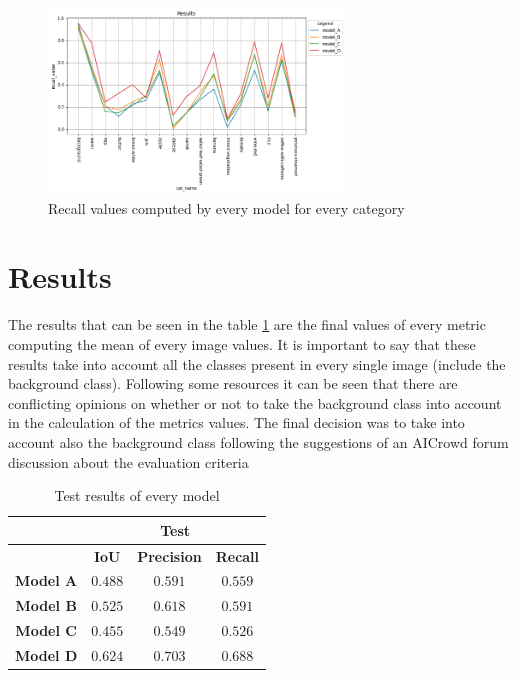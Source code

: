 \documentclass[a4paper,10pt]{report}
\begin{document}
\begin{figure}[h]
    \centering
    \includegraphics[width=0.7\textwidth]{assets/img/cat_recall.png}
    \caption{Recall values computed by every model for every category}
    \label{fig:cat_recall}
\end{figure}


\clearpage\section{Results}\label{sec:section-52}

The results that can be seen in the table \ref{table:test_results} are the final values of every metric computing the mean of every image values. It is important to say that these results take into account all the classes present in every single image (include the background class). Following some resources it can be seen that there are conflicting opinions on whether or not to take the background class into account in the calculation of the metrics values. The final decision was to take into account also the background class following the suggestions of an AICrowd forum discussion about the evaluation criteria \cite{evalcriteria}

\begin{table}[h]
  \center
  \begin{tabular}{|c|c|c|c|}
  \hline
    \multirow{2}{*}{} & \multicolumn{3}{c|}{\textbf{Test}}  \\ \hline                   
                        & \textbf{IoU} & \textbf{Precision} & \textbf{Recall} \\ \hline
    \textbf{Model A}   & $0.488$ & $0.591$ & $0.559$  \\ \hline
    \textbf{Model B}      & $0.525$ & $0.618$ & $0.591$ \\ \hline
    \textbf{Model C}       & $0.455$ & $0.549$ & $0.526$  \\ \hline
    \textbf{Model D} & $0.624$ & $ 0.703$ & $0.688$  \\ \hline
  \end{tabular}
  \caption{Test results of every model}
  \label{table:test_results}
\end{table}
\end{document}
